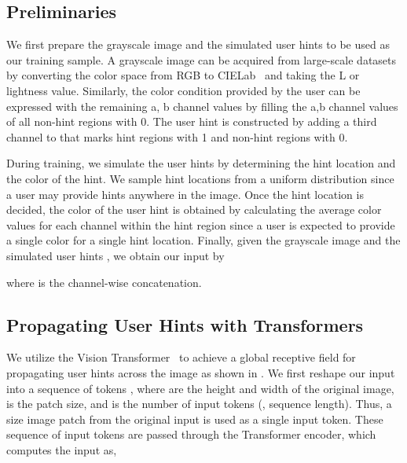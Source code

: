 \documentclass[10pt,twocolumn,letterpaper]{article}
\begin{document}
\vspace{-0.1cm}
\subsection{Preliminaries}

We first prepare the grayscale image  and the simulated user hints  to be used as our training sample. 
A grayscale image  can be acquired from large-scale datasets by converting the color space from RGB to CIELab~\cite{cie} and taking the L or lightness value. 
Similarly, the color condition  provided by the user can be expressed with the remaining a, b channel values  by filling the a,b channel values of all non-hint regions with 0. 
The user hint  is constructed by adding a third channel to  that marks hint regions with 1 and non-hint regions with 0. 

During training, we simulate the user hints by determining the hint location and the color of the hint. 
We sample hint locations from a uniform distribution since a user may provide hints anywhere in the image. 
Once the hint location is decided, the color of the user hint is obtained by calculating the average color values for each channel within the hint region since a user is expected to provide a single color for a single hint location. 
Finally, given the grayscale image  and the simulated user hints , we obtain our input  by

where  is the channel-wise concatenation. 

\subsection{Propagating User Hints with Transformers}

We utilize the Vision Transformer~\cite{vit} to achieve a global receptive field for propagating user hints across the image as shown in . 
We first reshape our input  into a sequence of tokens , where  are the height and width of the original image,  is the patch size, and  is the number of input tokens (\ie, sequence length). 
Thus, a  size image patch from the original input  is used as a single input token.
These sequence of input tokens are passed through the Transformer encoder, which computes the input as, 

\vspace{-0.4cm}

\vspace{-0.3cm}

\vspace{-0.3cm}
\end{document}
